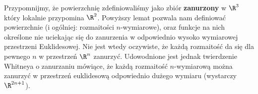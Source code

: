 
\begin{uwaga}
Przypomnijmy, że powierzchnię zdefiniowaliśmy jako zbiór \textbf{zanurzony} w $\R^3$ który lokalnie przypomina $\R^2$.
Powyższy lemat pozwala nam definiować powierzchnie (i ogólniej: rozmaitości $n$-wymiarowe), oraz funkcje na nich określone nie uciekając się do zanurzenia w odpowiednio wysoko wymiarowej przestrzeni Euklidesowej. Nie jest wtedy oczywiste, że każdą rozmaitość da się dla pewnego $n$ w przestrzeń $\R^n$ zanurzyć. Udowodnione jest jednak twierdzenie Whitneya o zanurzaniu mówiące, że każdą rozmaitość $n$-wymiarową można zanurzyć w przestrzeń euklidesową odpowiednio dużego wymiaru (wystarczy $\R^{2n+1}$).
\end{uwaga}
% 

